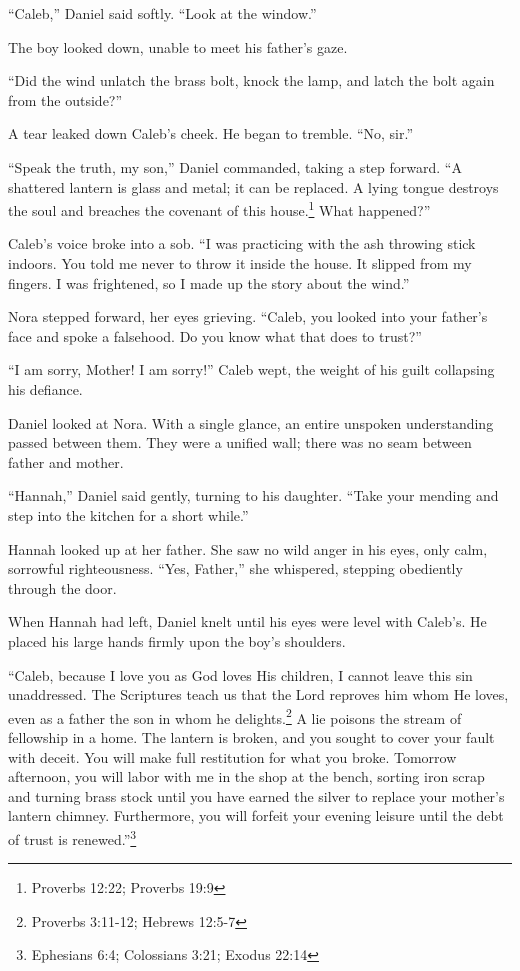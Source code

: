 \documentclass[11pt]{article}
\begin{document}
``Caleb,'' Daniel said softly. ``Look at the window.''

The boy looked down, unable to meet his father's gaze.

``Did the wind unlatch the brass bolt, knock the lamp, and latch the bolt again from the outside?''

A tear leaked down Caleb's cheek. He began to tremble. ``No, sir.''

``Speak the truth, my son,'' Daniel commanded, taking a step forward. ``A shattered lantern is glass and metal; it can be replaced. A lying tongue destroys the soul and breaches the covenant of this house.\footnote{Proverbs 12:22; Proverbs 19:9} What happened?''

Caleb's voice broke into a sob. ``I was practicing with the ash throwing stick indoors. You told me never to throw it inside the house. It slipped from my fingers. I was frightened, so I made up the story about the wind.''

Nora stepped forward, her eyes grieving. ``Caleb, you looked into your father's face and spoke a falsehood. Do you know what that does to trust?''

``I am sorry, Mother! I am sorry!'' Caleb wept, the weight of his guilt collapsing his defiance.

Daniel looked at Nora. With a single glance, an entire unspoken understanding passed between them. They were a unified wall; there was no seam between father and mother.

``Hannah,'' Daniel said gently, turning to his daughter. ``Take your mending and step into the kitchen for a short while.''

Hannah looked up at her father. She saw no wild anger in his eyes, only calm, sorrowful righteousness. ``Yes, Father,'' she whispered, stepping obediently through the door.

When Hannah had left, Daniel knelt until his eyes were level with Caleb's. He placed his large hands firmly upon the boy's shoulders.

``Caleb, because I love you as God loves His children, I cannot leave this sin unaddressed. The Scriptures teach us that the Lord reproves him whom He loves, even as a father the son in whom he delights.\footnote{Proverbs 3:11-12; Hebrews 12:5-7} A lie poisons the stream of fellowship in a home. The lantern is broken, and you sought to cover your fault with deceit. You will make full restitution for what you broke. Tomorrow afternoon, you will labor with me in the shop at the bench, sorting iron scrap and turning brass stock until you have earned the silver to replace your mother's lantern chimney. Furthermore, you will forfeit your evening leisure until the debt of trust is renewed.''\footnote{Ephesians 6:4; Colossians 3:21; Exodus 22:14}
\end{document}
